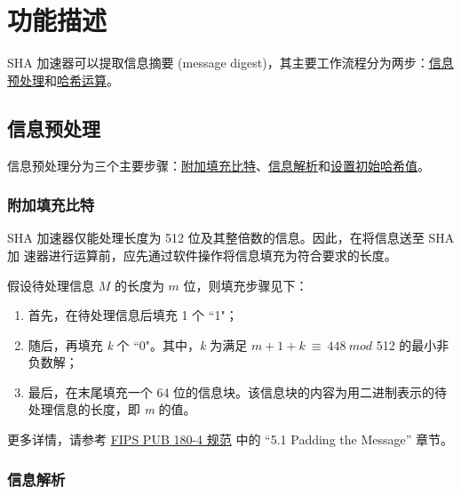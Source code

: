 \documentclass[main\_\_CN.tex]{subfiles}
\begin{document}
\section{功能描述}

SHA 加速器可以提取信息摘要 (message digest)，其主要工作流程分为两步：\hyperref[sec:sha-preprocessing]{信息预处理}和\hyperref[sec:sha-hash-operation]{哈希运算}。

\subsection{信息预处理}\label{sec:sha-preprocessing}

信息预处理分为三个主要步骤：\hyperref[sec:sha-padding-msg]{附加填充比特}、\hyperref[sec:sha-parsing-msg]{信息解析}和\hyperref[sec:sha-set-initial-hash]{设置初始哈希值}。

\subsubsection{附加填充比特}\label{sec:sha-padding-msg}

SHA 加速器仅能处理长度为 512 位及其整倍数的信息。因此，在将信息送至 SHA 加
速器进行运算前，应先通过软件操作将信息填充为符合要求的长度。

假设待处理信息 \begin{math} M \end{math} 的长度为 \begin{math} m \end{math} 位，则填充步骤见下：

\begin{enumerate}
    \item 首先，在待处理信息后填充 1 个 ``1"；
    \item 随后，再填充 {\it{k}} 个 ``0"。其中，{\it{k}} 为满足 \begin{math}m + 1 + k \ {\equiv} \ 448 \ mod \end{math} 512 的最小非负数解；
    \item 最后，在末尾填充一个 64 位的信息块。该信息块的内容为用二进制表示的待处理信息的长度，即 {\it{m}} 的值。
\end{enumerate}

更多详情，请参考 \href{https://doi.org/10.6028/NIST.FIPS.180-4}{FIPS PUB 180-4 规范} 中的 “5.1 Padding the Message” 章节。

\subsubsection{信息解析}\label{sec:sha-parsing-msg}
\end{document}
